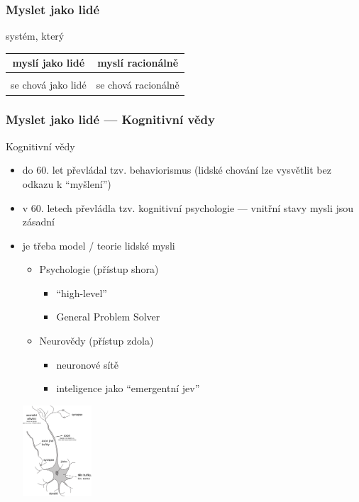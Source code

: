 \documentclass[red,handout,professionalfont]{beamer}
\theoremstyle{definition}
\newcommand{\0}{\mbox{${\bf 0}$}}
\begin{document}
\begin{frame}\frametitle{Myslet jako lidé}
\large
\begin{center}
systém, který\\[1cm]
\begin{tabular}{c|c}
 \alert{myslí jako lidé} & myslí racionálně \\[0.5cm]
 \hline
\\
 se chová jako lidé & se chová racionálně \\
\end{tabular}
\end{center}
\end{frame}




\begin{frame}\frametitle{Myslet jako lidé --- Kognitivní vědy}
\begin{block}{}
\begin{center}
Kognitivní vědy
\end{center}
\end{block}\pause{}
\begin{itemize}
 \item do 60. let převládal tzv. behaviorismus (lidské chování lze vysvětlit bez odkazu k ``myšlení'')\pause{}
 \item v 60. letech převládla tzv. kognitivní psychologie --- vnitřní stavy mysli jsou zásadní\pause{}
 \item je třeba model / teorie lidské mysli\hskip-1cm\pause{}
 \begin{minipage}[b]{5.6cm}
 \begin{itemize}
   \item[] Psychologie (přístup shora)\pause{}
   \begin{itemize}
     \item ``high-level''\pause{}
     \item General Problem Solver\pause{}
   \end{itemize}   
   \item[] Neurovědy (přístup zdola)\pause{}
   \begin{itemize}
     \item neuronové sítě\pause{}
     \item inteligence jako ``emergentní jev''\pause{}
   \end{itemize}
 \end{itemize}
 \end{minipage}
 \begin{minipage}[b]{4cm}
  \hskip1cm
  \includegraphics[height=3.4cm]{neuron.pdf}
 \end{minipage}
\end{itemize}
\end{frame}
\end{document}
